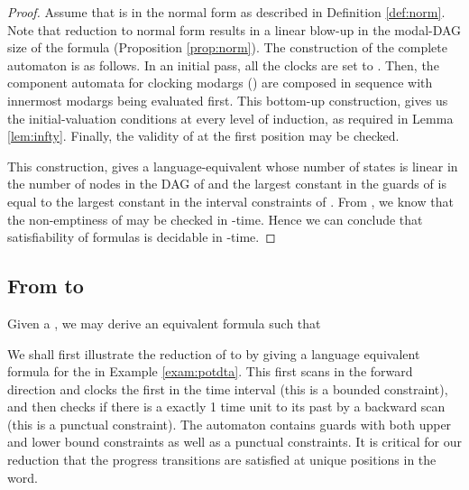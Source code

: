 \documentclass{llncs}
\newcommand{\potdta}{\mbox{}}
\newcommand{\mitlfpinf}{\mbox{}}
\newcommand{\np}{\mbox{}}
\begin{document}
\begin{proof}
Assume that  is in the normal form as described in Definition \ref{def:norm}. Note that reduction to normal form results in a linear blow-up in the modal-DAG size of the formula (Proposition \ref{prop:norm}). 
The construction of the complete automaton  is as follows.
In an initial pass, all the  clocks are
set to . Then, the component automata  for clocking modargs () are composed in sequence with innermost modargs being evaluated first. This bottom-up construction, gives us the initial-valuation conditions at every level of induction, as required in Lemma \ref{lem:infty}. Finally, the validity of  at the first position may be checked. 

This construction, gives a language-equivalent \potdta\/ whose number of states is linear in the number of nodes in the DAG of  and the largest constant in the guards of  is equal to the largest constant in the interval constraints of . From \cite{PS10}, we know that the non-emptiness of  may be checked in \np-time. Hence we can conclude that satisfiability of \mitlfpinf\/ formulas is decidable in \np-time.
\end{proof}
 


\subsection{From \potdta\/ to \mitlfpinf}
\begin{theorem}
Given a \potdta\/ , we may derive an equivalent \mitlfpinf\/ formula  such that 
\end{theorem}


We shall first illustrate the reduction of  to  by giving a language 
equivalent \mitlfpinf\/ formula for the \potdta\/ in Example \ref{exam:potdta}. This \potdta\/ first scans in the forward direction and clocks the first  in the time interval  (this is a bounded constraint), and then checks if there is a  exactly 1 time unit to its past by a backward scan (this is a punctual constraint).
The automaton contains guards with both upper and lower bound constraints as well as a punctual constraints. It is critical for our reduction that the progress transitions are satisfied at unique positions in the word. 
\end{document}
